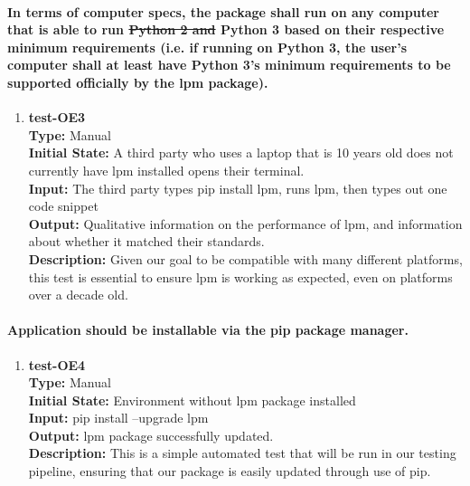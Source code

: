 \documentclass[12pt, titlepage]{article}
\begin{document}
\paragraph{In terms of computer specs, the package shall run on any computer that is
able to run \sout{Python 2 and} Python 3 based on their respective minimum requirements (i.e.
if running on Python 3, the user’s computer shall at least have Python 3’s minimum
requirements to be supported officially by the lpm package).}
\begin{enumerate}
    \item{\textbf{test-OE3}\\}
    \textbf{Type:} Manual\\
    \textbf{Initial State:} A third party who uses a laptop that is 10 years old does not currently have lpm installed opens their terminal.\\
    \textbf{Input:} The third party types pip install lpm, runs lpm, then types out one code snippet\\
    \textbf{Output:} Qualitative information on the performance of lpm, and information about whether it matched their standards.\\
    \textbf{Description:} Given our goal to be compatible with many different platforms, this test is essential to ensure lpm is working as expected, even on platforms over a decade old.\\
\end{enumerate}

\paragraph{Application should be installable via the pip package manager.}
\begin{enumerate}
    \item{\textbf{test-OE4}\\}
    \textbf{Type:} Manual\\
    \textbf{Initial State:} Environment without lpm package installed\\
    \textbf{Input:} pip install --upgrade lpm\\
    \textbf{Output:} lpm package successfully updated.\\
    \textbf{Description:} This is a simple automated test that will be run in our testing pipeline, ensuring that our package is easily updated through use of pip. \\
\end{enumerate}
\end{document}
